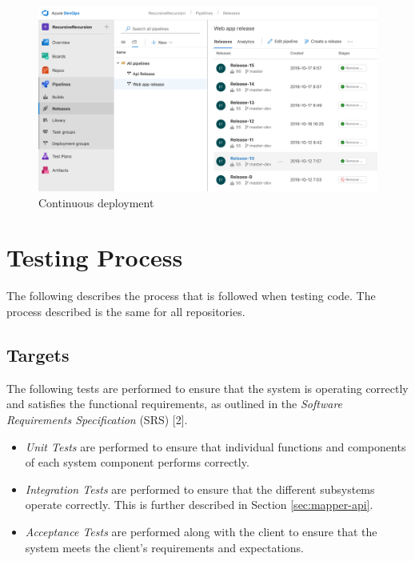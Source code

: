 \documentclass{article}
\begin{document}
    \begin{figure}[H]
        \centering
        \includegraphics[scale=0.3]{Deployment}
        \caption{Continuous deployment}
        \label{fig:deployment}
    \end{figure}
    \newpage


    \section{Testing Process}
    \label{sec:process}

    The following describes the process that is followed when testing code. The
    process described is the same for all repositories.

    \subsection{Targets}
    \label{sec:targets}

    The following tests are performed to ensure that the system is operating
    correctly and satisfies the functional requirements, as outlined in the
    \textit{Software Requirements Specification} (SRS) [2].

    \begin{itemize}
        \item \textit{Unit Tests} are performed to ensure that individual
            functions and components of each system component performs
            correctly.
        \item \textit{Integration Tests} are performed to ensure that the
            different subsystems operate correctly. This is further described
            in Section \ref{sec:mapper-api}.
        \item \textit{Acceptance Tests} are performed along with the client to
            ensure that the system meets the client's requirements and
            expectations.
    \end{itemize}
\end{document}

